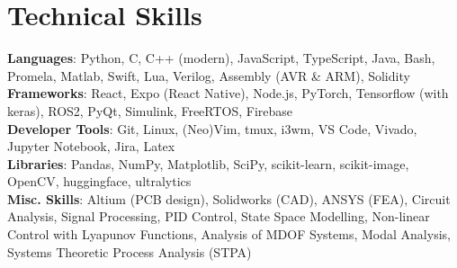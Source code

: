 \documentclass[letterpaper,11pt]{article}
\begin{document}
%
\section{Technical Skills}
\begin{itemize}[leftmargin=0.15in, label={}]
  \small{\item{
                \textbf{Languages}{: Python, C, C++ (modern), JavaScript, TypeScript, Java, Bash, Promela, Matlab, Swift, Lua, Verilog, Assembly (AVR \& ARM), Solidity} \\
                \textbf{Frameworks}{: React, Expo (React Native), Node.js, PyTorch, Tensorflow (with keras), ROS2, PyQt, Simulink, FreeRTOS, Firebase} \\
                \textbf{Developer Tools}{: Git, Linux, (Neo)Vim, tmux, i3wm, VS Code, Vivado, Jupyter Notebook, Jira, Latex} \\
                \textbf{Libraries}{: Pandas, NumPy, Matplotlib, SciPy, scikit-learn, scikit-image, OpenCV, huggingface, ultralytics} \\
                \textbf{Misc. Skills}{: Altium (PCB design), Solidworks (CAD), ANSYS (FEA), Circuit Analysis, Signal Processing, PID Control, State Space Modelling, Non-linear Control with Lyapunov Functions}, Analysis of MDOF Systems, Modal Analysis, Systems Theoretic Process Analysis (STPA)
          }}
\end{itemize}

\end{document}
